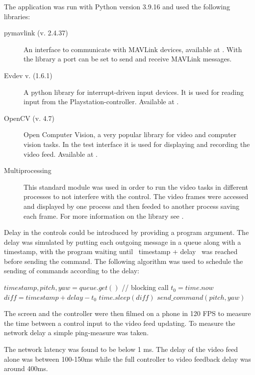 \documentclass[nofilelist]{cslthse-msc}
\begin{document}
The application was run with Python version 3.9.16 and used the following libraries:
\begin{description} 
   \item [pymavlink (v. 2.4.37)]
   An interface to communicate with MAVLink devices, available at \cite{pymavlink}. With the library a port can be set to send and receive MAVLink messages.
 
   \item [Evdev v. (1.6.1)]
   A python library for interrupt-driven input devices. It is used for reading input from the Playstation-controller. Available at \cite{evdev}.

   \item [OpenCV (v. 4.7)] 
   Open Computer Vision, a very popular library for video and computer vision tasks. In the test interface it is used for displaying and recording the video feed. Available at \cite{opencv}.

   \item[Multiprocessing]
   This standard module was used in order to run the video tasks in different processes to not interfere with the control. The video frames were accessed and displayed by one process and then feeded to another process saving each frame. For more information on the library see \cite{multiprocessing}.  
\end{description}

Delay in the controls could be introduced by providing a program argument. The delay was simulated by putting each outgoing message in a queue along with a timestamp, with the program waiting until \ timestamp + delay \ was reached before sending the command. The following algorithm was used to schedule the sending of commands according to the delay:
\begin{algorithmic}
   \State $timestamp, pitch, yaw = queue.get()$ // blocking call
   \State $t_{0} = time.now$
   \State $diff = timestamp + delay - t_{0}$
      \State $time.sleep(diff)$
   \EndIf
   \State $send\_command(pitch, yaw)$
   \EndWhile
\end{algorithmic}

The screen and the controller were then filmed on a phone in 120 FPS to measure the time between a control input to the video feed updating. To measure the network delay a simple ping-measure was taken.

The network latency was found to be below 1 ms. The delay of the video feed alone was between 100-150ms while the full controller to video feedback delay was around 400ms. 
\end{document}
